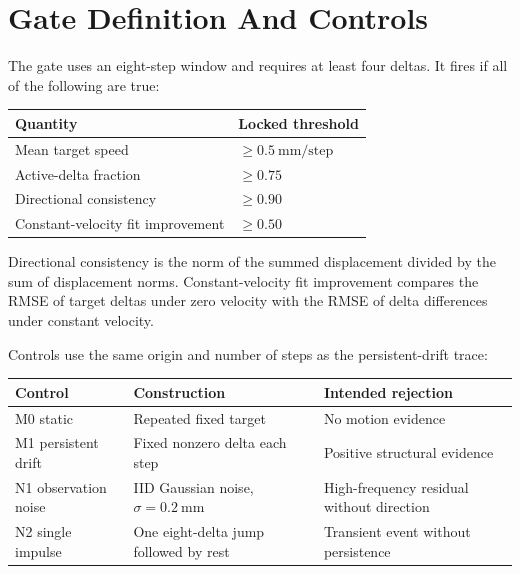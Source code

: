 \documentclass[10pt]{article}
\begin{document}
\section{Gate Definition And Controls}

The gate uses an eight-step window and requires at least four deltas. It fires if all of the following are true:

\begin{table}[htbp]
\centering
\small
\begin{tabularx}{\textwidth}{@{}>{\raggedright\arraybackslash}X >{\raggedright\arraybackslash}X@{}}
\toprule
Quantity & Locked threshold \\
\midrule
Mean target speed & \(\ge 0.5\ \mathrm{mm/step}\) \\
Active-delta fraction & \(\ge 0.75\) \\
Directional consistency & \(\ge 0.90\) \\
Constant-velocity fit improvement & \(\ge 0.50\) \\
\bottomrule
\end{tabularx}
\end{table}

Directional consistency is the norm of the summed displacement divided by the sum of displacement norms. Constant-velocity fit improvement compares the RMSE of target deltas under zero velocity with the RMSE of delta differences under constant velocity.

Controls use the same origin and number of steps as the persistent-drift trace:

\begin{table}[htbp]
\centering
\small
\begin{tabularx}{\textwidth}{@{}>{\raggedright\arraybackslash}X >{\raggedright\arraybackslash}X >{\raggedright\arraybackslash}X@{}}
\toprule
Control & Construction & Intended rejection \\
\midrule
M0 static & Repeated fixed target & No motion evidence \\
M1 persistent drift & Fixed nonzero delta each step & Positive structural evidence \\
N1 observation noise & IID Gaussian noise, \(\sigma=0.2\ \mathrm{mm}\) & High-frequency residual without direction \\
N2 single impulse & One eight-delta jump followed by rest & Transient event without persistence \\
\bottomrule
\end{tabularx}
\end{table}
\end{document}
